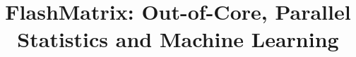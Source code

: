 \documentclass[letterpaper,twocolumn,10pt]{article}
\begin{document}
\date{}

\title{FlashMatrix: Out-of-Core, Parallel Statistics and Machine Learning}

\author{}


\maketitle

\vspace{-25pt}

\thispagestyle{empty}
\end{document}
